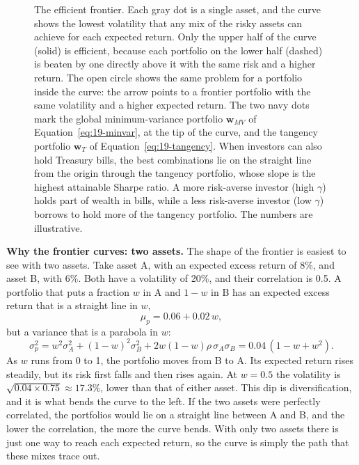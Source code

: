 \begin{figure}[htbp]
{%
}
\caption{The efficient frontier. Each gray dot is a single asset, and the curve shows the lowest volatility that any mix of the risky assets can achieve for each expected return. Only the upper half of the curve (solid) is efficient, because each portfolio on the lower half (dashed) is beaten by one directly above it with the same risk and a higher return. The open circle shows the same problem for a portfolio inside the curve: the arrow points to a frontier portfolio with the same volatility and a higher expected return. The two navy dots mark the global minimum-variance portfolio $\mathbf{w}_{MV}$ of Equation~\eqref{eq:19-minvar}, at the tip of the curve, and the tangency portfolio $\mathbf{w}_T$ of Equation~\eqref{eq:19-tangency}. When investors can also hold Treasury bills, the best combinations lie on the straight line from the origin through the tangency portfolio, whose slope is the highest attainable Sharpe ratio. A more risk-averse investor (high $\gamma$) holds part of wealth in bills, while a less risk-averse investor (low $\gamma$) borrows to hold more of the tangency portfolio. The numbers are illustrative.}
\label{fig:19-frontier}
\end{figure}

\textbf{Why the frontier curves: two assets.}\label{sec:19-frontier-derivation} The shape of the frontier is easiest to see with two assets. Take asset A, with an expected excess return of 8\%, and asset B, with 6\%. Both have a volatility of 20\%, and their correlation is 0.5. A portfolio that puts a fraction $w$ in A and $1 - w$ in B has an expected excess return that is a straight line in $w$,
\begin{equation}
  \mu_p = 0.06 + 0.02\,w,
  \label{eq:19-two-mean}
\end{equation}
but a variance that is a parabola in $w$:
\begin{equation}
  \sigma_p^2 = w^2\sigma_A^2 + (1-w)^2\sigma_B^2 + 2w(1-w)\rho\,\sigma_A\sigma_B = 0.04\,(1 - w + w^2).
  \label{eq:19-two-var}
\end{equation}
As $w$ runs from 0 to 1, the portfolio moves from B to A. Its expected return rises steadily, but its risk first falls and then rises again. At $w = 0.5$ the volatility is $\sqrt{0.04 \times 0.75} \approx 17.3\%$, lower than that of either asset. This dip is diversification, and it is what bends the curve to the left. If the two assets were perfectly correlated, the portfolios would lie on a straight line between A and B, and the lower the correlation, the more the curve bends. With only two assets there is just one way to reach each expected return, so the curve is simply the path that these mixes trace out.

